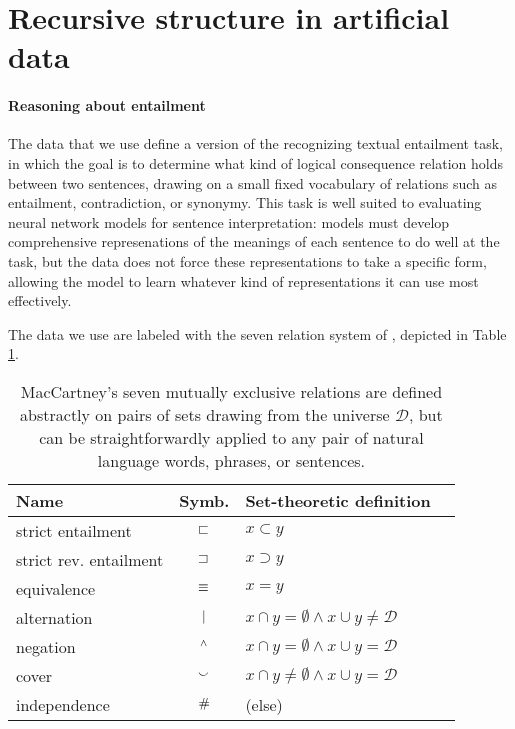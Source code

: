 \section{Recursive structure in artificial data}\label{sec:recursion}
\paragraph{Reasoning about entailment} 
The data that we use define a version of the recognizing textual entailment task, in which the goal is to determine what kind of logical consequence relation holds between two sentences, drawing on a small fixed vocabulary of relations such as entailment, contradiction, or synonymy. This task is well suited to evaluating neural network models for sentence interpretation: models must develop comprehensive represenations of the meanings of each sentence to do well at the task, but the data does not force these representations to take a specific form, allowing the model to learn whatever kind of representations it can use most effectively.

The data we use are labeled with the seven relation system of , depicted in Table \ref{b-table}.

\begin{table}[tp]
  \centering\small
  \renewcommand{\arraystretch}{1}
  \begin{tabular}{l c l l} 
    \toprule
    Name & Symb. & Set-theoretic definition \\ 
    \midrule
strict entailment         & $\sqsubset$   & $x \subset y$  \\ 
    strict rev. entailment & $\sqsupset$   & $x \supset y$  \\ 
    equivalence        & $\equiv$    & $x = y$   \\ 
    alternation        & $\mathbin{|}$   & $x \cap y = \emptyset \wedge x \cup y \neq \mathcal{D}$ \\ 
    negation           & $\mathbin{^{\wedge}}$   & $x \cap y = \emptyset \wedge x \cup y = \mathcal{D}$   \\
    cover              & $\mathbin{\smallsmile}$   & $x \cap y \neq \emptyset \wedge x \cup y = \mathcal{D}$ \\ 
    independence       & $\mathbin{\#}$   & (else)\\
    \bottomrule
  \end{tabular}
  \caption{\label{b-table}MacCartney's seven mutually exclusive relations are defined abstractly on pairs of sets drawing from the universe $\mathcal{D}$, but can be straightforwardly applied to any pair of natural language words, phrases, or sentences.
  } %
\end{table}

